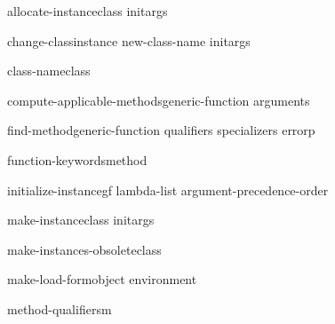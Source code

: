 \begin{generic}{allocate-instance}{class \rest initargs}{}{}
  
\end{generic}

\begin{generic}{change-class}{instance new-class-name \rest initargs \akeys}{}{}
  
\end{generic}

\begin{generic}{class-name}{class}{}{}
  
\end{generic}

\begin{generic}{compute-applicable-methods}{generic-function arguments}{}{}
  
\end{generic}

\begin{generic}{find-method}{generic-function qualifiers specializers \op errorp}{}{}
  
\end{generic}

\begin{generic}{function-keywords}{method}{}{}
  
\end{generic}

\begin{generic}{initialize-instance}{gf \key lambda-list argument-precedence-order \akeys}{}{}
  
\end{generic}

\begin{generic}{make-instance}{class \rest initargs \akeys}{}{}
  
\end{generic}

\begin{generic}{make-instances-obsolete}{class}{}{}
  
\end{generic}

\begin{generic}{make-load-form}{object \op environment}{}{}
  
\end{generic}

\begin{generic}{method-qualifiers}{m}{}{}
  
\end{generic}

